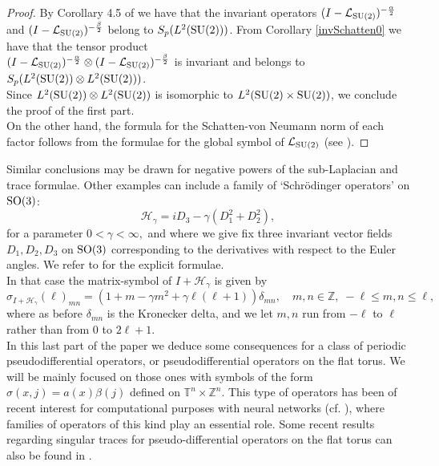 \documentclass[a4paper,12pt,reqno]{amsart}
\theoremstyle{definition}
\theoremstyle{remark}
\numberwithin{equation}{section}
\def\Tn{{{\mathbb T}^n}}
\def\Zn{{{\mathbb Z}^n}}
\def\SU2{{{\rm SU(2)}}}
\def\SO3{{{\rm SO(3)}}}
\def\lapsu2{{{\mathcal L}_\SU2}}
\def\lapsu2{{{\mathcal L}_\SU2}}
\begin{document}
\begin{proof} By  Corollary 4.5 of \cite{dr13:schatten} we have that the invariant operators 
$(I-\lapsu2)^{-\frac{\alpha}{2}}$ and $(I-\lapsu2)^{-\frac{\beta}{2}}$ belong to $S_p(L^2(\SU2))$. From Corollary \ref{invSchatten0} we have that the tensor product\\ $(I-\lapsu2)^{-\frac{\alpha}{2}}\otimes (I-\lapsu2)^{-\frac{\beta}{2}}$ is invariant and  belongs to $S_p(L^2(\SU2)\otimes 
 L^2(\SU2))$. \\
 
 Since $L^2(\SU2)\otimes L^2(\SU2)$ is isomorphic to $L^2(\SU2\times\SU2)$, 
 we conclude the proof of the first part.\\

On the other hand, the formula for the Schatten-von Neumann norm of each factor follows from the formulae for the global symbol of  $\lapsu2$ (see \cite{dr13:schatten}).     
\end{proof}
Similar conclusions may be drawn for negative powers of the sub-Laplacian and trace formulae.
Other examples can include a family of `Schr{\"o}dinger operators' on $\SO3$:
\[\mathcal H_{\gamma}=iD_3-\gamma(D_1^2+D_2^2),\]
for a parameter $0<\gamma<\infty,$ and where we give fix three invariant vector fields $D_1, D_2, D_3$ on $\SO3$ corresponding to the derivatives with
respect to the Euler angles. We refer to \cite[Chapter 11]{rt:book} for the explicit formulae.\\

In that case the matrix-symbol of $I+\mathcal H_{\gamma}$ is given by 
\begin{equation}\label{EQ:SO3-schor}
\sigma_{I+\mathcal H_{\gamma}}(\ell)_{mn}=(1+m-\gamma m^2+\gamma\ell(\ell+1))\delta_{mn},\quad m,n\in\mathbb Z,\;
-\ell\leq m,n\leq\ell,
\end{equation}
where as before $\delta_{mn}$ is the Kronecker delta, and we let $m,n$ run from
$-\ell$ to $\ell$ rather than from $0$ to $2\ell+1$.\\

In this last part of the paper we deduce some consequences for a class of periodic pseudodifferential operators, or pseudodifferential operators on the flat torus. We will be mainly focused on those ones with symbols of the form $\sigma(x,j)=a(x)\beta(j)$ defined on $\Tn\times \Zn$. This type of operators has been of recent interest for computational purposes with neural networks  (cf. \cite{pnetw:ko}), where families of operators of this kind play an essential role. Some recent results regarding singular traces for pseudo-differential operators on the flat torus can also be found in  \cite{Piet:trace2}.\\
\end{document}
